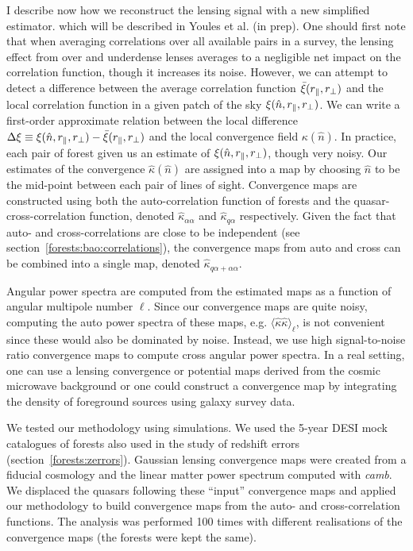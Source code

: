 I describe now how we reconstruct the lensing signal with a new simplified estimator.
which will be described in Youles et al. (in prep). 
One should first note that when averaging correlations over all available pairs in a survey, 
the lensing effect from over and underdense lenses averages to a negligible net impact 
on the correlation function, though it increases its noise.
However, we can attempt to detect a difference 
between the average correlation function $\bar{\xi}({r_\parallel}, {r_\perp})$ 
and the local correlation function in a given patch of the sky 
$\xi(\hat{n}, {r_\parallel}, {r_\perp})$. 
We can write a first-order approximate relation between the local 
difference $\Delta \xi \equiv  \xi(\hat{n}, {r_\parallel}, {r_\perp}) - \bar{\xi}({r_\parallel}, {r_\perp})$
and the local convergence field $\kappa(\hat{n})$.
In practice, each pair of forest given us an estimate of $\xi(\hat{n}, {r_\parallel}, {r_\perp})$,
though very noisy. 
Our estimates of the convergence $\hat{\kappa}(\hat{n})$ are assigned into a 
map by choosing $\hat{n}$ to  be  the mid-point between each pair of lines of sight. 
Convergence maps are constructed using both the auto-correlation function of forests 
and the quasar-\lya cross-correlation function, denoted $\hat{\kappa}_{\alpha \alpha}$ 
and $\hat{\kappa}_{q \alpha}$ respectively. 
Given the fact that auto- and cross-correlations are close to be independent 
(see section~\ref{forests:bao:correlations}), the convergence maps from auto and cross
can be combined into a single map, denoted $\hat{\kappa}_{q \alpha + \alpha \alpha}$. 

Angular power spectra are computed from the estimated maps as a function of 
angular multipole number $\ell$. 
Since our convergence maps are quite noisy, computing the auto 
power spectra of these maps, e.g. $\langle \hat{\kappa} \hat{\kappa} \rangle_\ell$, 
is not convenient since these would also be dominated by noise. 
Instead, we use high signal-to-noise ratio convergence maps to compute cross 
angular power spectra. In a real setting, one can use a lensing convergence or potential 
maps derived from the cosmic microwave background or one could construct a 
convergence map by integrating the density of foreground sources using galaxy survey data. 

We tested our methodology using simulations. 
We used the 5-year DESI mock catalogues of \lya forests also used in the study of redshift
errors (section~\ref{forests:zerrors}). 
Gaussian lensing convergence maps were created from a fiducial cosmology and the 
linear matter power spectrum computed with \textsl{camb}. 
We displaced the quasars following these ``input'' convergence maps 
and applied our methodology to build convergence maps 
from the auto- and cross-correlation functions. 
The analysis was performed 100 times with different realisations of the convergence maps
(the forests were kept the same). 

